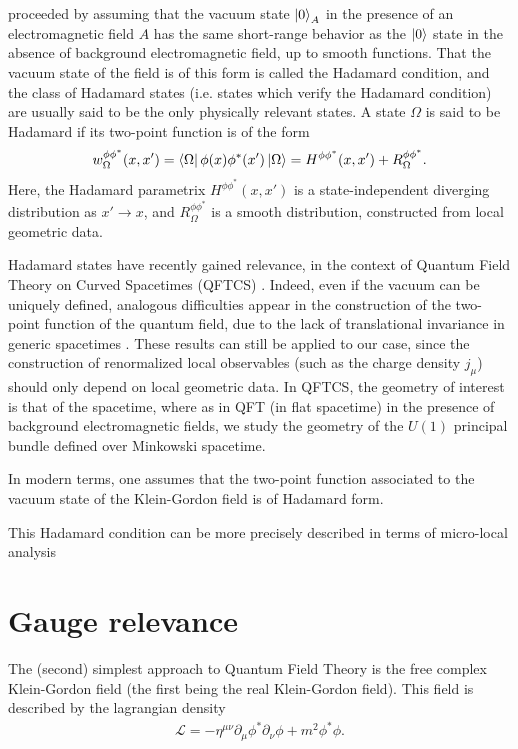 \cite{Dirac1934} proceeded by assuming that the vacuum state $\ket{0}_A$ in the presence of an electromagnetic field $A$ has the same short-range behavior as the $\ket{0}$ state in the absence of background electromagnetic field, up to smooth functions. That the vacuum state of the field is of this form is called the Hadamard condition, and the class of Hadamard states (i.e. states which verify the Hadamard condition) are usually said to be the only physically relevant states.
A state $\Omega$ is said to be Hadamard if its two-point function is of the form 
\begin{align}
   w^{\phi \phi^*}_\Omega (x, x') = \bra{\Omega} \phi(x) \phi^*(x') \ket{\Omega} =  H^{\phi \phi^*}(x, x') + R^{\phi \phi^*}_\Omega.
\end{align}
Here, the Hadamard parametrix $H^{\phi \phi^*}(x, x')$ is a state-independent diverging distribution as $x' \to x$, and $R^{\phi \phi^*}_\Omega$ is a smooth distribution, constructed from local geometric data.


Hadamard states have recently gained relevance, in the context of Quantum Field Theory on Curved Spacetimes (QFTCS) \cite{Wald1977, Hollands_2015, Wald1994}. Indeed, even if the vacuum can be uniquely defined,  analogous difficulties appear in the construction of the two-point function of the quantum field, due to the lack of translational invariance in generic spacetimes . These results can still be applied to our case, since the construction of renormalized local observables (such as the charge density $j_\mu$) should only depend on local geometric data. In QFTCS, the geometry of interest is that of the spacetime, where as in QFT (in flat spacetime) in the presence of background electromagnetic fields, we study the geometry of the $U(1)$ principal bundle defined over Minkowski spacetime.

In modern terms, one assumes that the two-point function associated to the vacuum state of the Klein-Gordon field is of Hadamard form.

This Hadamard condition can be more precisely described in terms of micro-local analysis
\section{Gauge relevance}
The (second) simplest approach to Quantum Field Theory is the free complex Klein-Gordon field (the first being the real Klein-Gordon field). This field is described by the lagrangian density \begin{align}
    \mathcal{L}= - \eta^{\mu\nu}\partial_\mu \phi^* \partial_\nu \phi + m^2 \phi^* \phi.
    \label{eq:free-complex-lagrangian}
\end{align}

